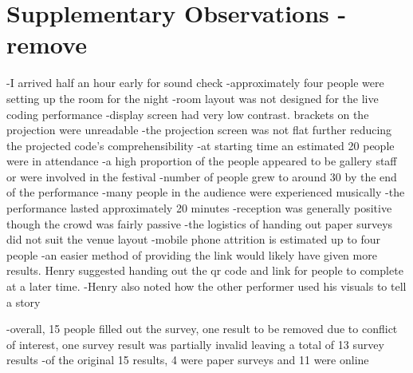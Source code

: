 \section{Supplementary Observations - remove}
-I arrived half an hour early for sound check
-approximately four people were setting up the room for the night
-room layout was not designed for the live coding performance
-display screen had very low contrast. brackets on the projection were unreadable
-the projection screen was not flat further reducing the projected code’s comprehensibility
-at starting time an estimated 20 people were in attendance
-a high proportion of the people appeared to be gallery staff or were involved in the festival
-number of people grew to around 30 by the end of the performance
-many people in the audience were experienced musically
-the performance lasted approximately 20 minutes
-reception was generally positive though the crowd was fairly passive
-the logistics of handing out paper surveys did not suit the venue layout
-mobile phone attrition is estimated up to four people
-an easier method of providing the link would likely have given more results. Henry suggested handing out the qr code and link for people to complete at a later time.
-Henry also noted how the other performer used his visuals to tell a story

-overall, 15 people filled out the survey, one result to be removed due to conflict of interest, one survey result was partially invalid leaving a total of 13 survey results
-of the original 15 results, 4 were paper surveys and 11 were online

